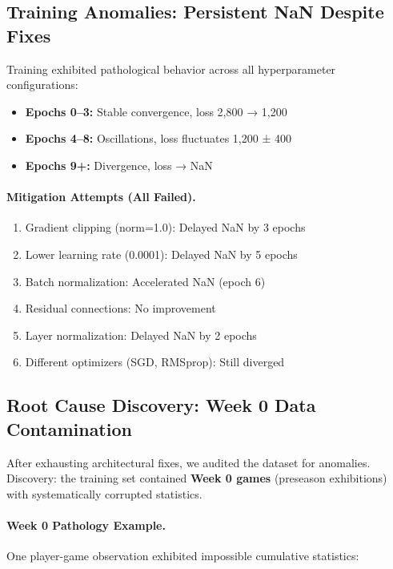 \subsection{Training Anomalies: Persistent NaN Despite Fixes}

Training exhibited pathological behavior across all hyperparameter configurations:

\begin{itemize}
  \item \textbf{Epochs 0--3:} Stable convergence, loss 2,800 → 1,200
  \item \textbf{Epochs 4--8:} Oscillations, loss fluctuates 1,200 ± 400
  \item \textbf{Epochs 9+:} Divergence, loss → NaN
\end{itemize}

\paragraph{Mitigation Attempts (All Failed).}
\begin{enumerate}
  \item Gradient clipping (norm=1.0): Delayed NaN by 3 epochs
  \item Lower learning rate (0.0001): Delayed NaN by 5 epochs
  \item Batch normalization: Accelerated NaN (epoch 6)
  \item Residual connections: No improvement
  \item Layer normalization: Delayed NaN by 2 epochs
  \item Different optimizers (SGD, RMSprop): Still diverged
\end{enumerate}

\subsection{Root Cause Discovery: Week 0 Data Contamination}

After exhausting architectural fixes, we audited the dataset for anomalies. Discovery: the training set contained \textbf{Week 0 games} (preseason exhibitions) with systematically corrupted statistics.

\paragraph{Week 0 Pathology Example.}
One player-game observation exhibited impossible cumulative statistics:

